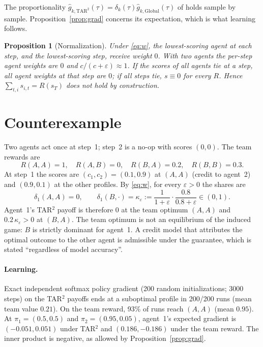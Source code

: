 \documentclass[11pt]{article}
\newtheorem{proposition}{Proposition}
\theoremstyle{remark}
\begin{document}
The proportionality $\hat g_{k,\mathrm{TAR^2}}(\tau)=\delta_k(\tau)\hat g_{k,\mathrm{Global}}(\tau)$ of \citet[Prop.~3.2]{kapoor2025tar2} holds sample by sample. Proposition~\ref{prop:grad} concerns its expectation, which is what learning follows.

\begin{proposition}[Normalization]\label{prop:norm}
Under \eqref{eq:w}, the lowest-scoring agent at each step, and the lowest-scoring step, receive weight $0$. With two agents the per-step agent weights are $0$ and $c/(c+\varepsilon)\approx1$. If the scores of all agents tie at a step, all agent weights at that step are $0$; if all steps tie, $s\equiv0$ for every $R$. Hence $\sum_{t,i}s_{i,t}=R(s_T)$ does not hold by construction.
\end{proposition}

\section{Counterexample}\label{sec:cex}

Two agents act once at step~1; step~2 is a no-op with scores $(0,0)$. The team rewards are
\[
R(A,A)=1,\quad R(A,B)=0,\quad R(B,A)=0.2,\quad R(B,B)=0.3 .
\]
At step~1 the scores are $(c_1,c_2)=(0.1,0.9)$ at $(A,A)$ (credit to agent~2) and $(0.9,0.1)$ at the other profiles. By \eqref{eq:w}, for every $\varepsilon>0$ the shares are
\[
\delta_1(A,A)=0,\qquad \delta_1(B,\cdot)=\kappa_\varepsilon:=\frac{1}{1+\varepsilon}\cdot\frac{0.8}{0.8+\varepsilon}\in(0,1).
\]
Agent~1's TAR$^2$ payoff is therefore $0$ at the team optimum $(A,A)$ and $0.2\,\kappa_\varepsilon>0$ at $(B,A)$. The team optimum is not an equilibrium of the induced game: $B$ is strictly dominant for agent~1. A credit model that attributes the optimal outcome to the other agent is admissible under the guarantee, which is stated ``regardless of model accuracy''.

\paragraph{Learning.} Exact independent softmax policy gradient (200 random initializations; 3000 steps) on the TAR$^2$ payoffs ends at a suboptimal profile in 200/200 runs (mean team value $0.21$). On the team reward, 93\% of runs reach $(A,A)$ (mean $0.95$). At $\pi_1=(0.5,0.5)$ and $\pi_2=(0.95,0.05)$, agent~1's expected gradient is $(-0.051,0.051)$ under TAR$^2$ and $(0.186,-0.186)$ under the team reward. The inner product is negative, as allowed by Proposition~\ref{prop:grad}.
\end{document}
